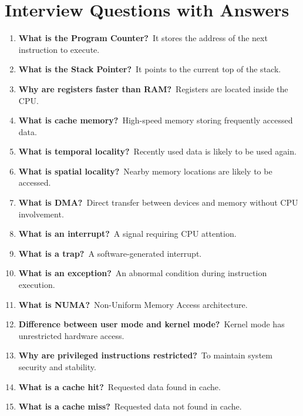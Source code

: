 \section{Interview Questions with Answers}

\begin{enumerate}
\item \textbf{What is the Program Counter?}\
It stores the address of the next instruction to execute.

\item \textbf{What is the Stack Pointer?}\
It points to the current top of the stack.

\item \textbf{Why are registers faster than RAM?}\
Registers are located inside the CPU.

\item \textbf{What is cache memory?}\
High-speed memory storing frequently accessed data.

\item \textbf{What is temporal locality?}\
Recently used data is likely to be used again.

\item \textbf{What is spatial locality?}\
Nearby memory locations are likely to be accessed.

\item \textbf{What is DMA?}\
Direct transfer between devices and memory without CPU involvement.

\item \textbf{What is an interrupt?}\
A signal requiring CPU attention.

\item \textbf{What is a trap?}\
A software-generated interrupt.

\item \textbf{What is an exception?}\
An abnormal condition during instruction execution.

\item \textbf{What is NUMA?}\
Non-Uniform Memory Access architecture.

\item \textbf{Difference between user mode and kernel mode?}\
Kernel mode has unrestricted hardware access.

\item \textbf{Why are privileged instructions restricted?}\
To maintain system security and stability.

\item \textbf{What is a cache hit?}\
Requested data found in cache.

\item \textbf{What is a cache miss?}\
Requested data not found in cache.
\end{enumerate}

